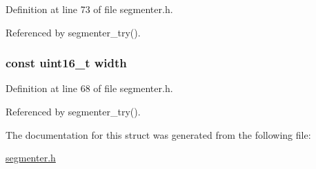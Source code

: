 \-Definition at line 73 of file segmenter.\-h.



\-Referenced by segmenter\-\_\-try().

\hypertarget{struct_video_params_a9751eb6040d62275201c4b184f1657cf}{
\subsubsection[{width}]{\setlength{\rightskip}{0pt plus 5cm}const uint16\-\_\-t {\bf width}}}\label{struct_video_params_a9751eb6040d62275201c4b184f1657cf}


\-Definition at line 68 of file segmenter.\-h.



\-Referenced by segmenter\-\_\-try().



\-The documentation for this struct was generated from the following file\-:\begin{DoxyCompactItemize}
\item 
\hyperlink{segmenter_8h}{segmenter.\-h}\end{DoxyCompactItemize}
